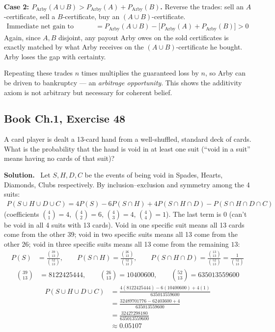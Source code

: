 \documentclass[11pt]{article}
\newcommand{\Sol}{\vspace{2pt}\noindent\textbf{Solution.}\ }
\begin{document}
\textbf{Case 2: $P_{\text{Arby}}(A\cup B) > P_{\text{Arby}}(A)+P_{\text{Arby}}(B)$.}
Reverse the trades: sell an $A$-certificate, sell a $B$-certificate, buy an $(A\cup B)$-certificate.
\begin{align*}
\text{Immediate net gain to Arby's counterparty} &= P_{\text{Arby}}(A\cup B) - \big[P_{\text{Arby}}(A)+P_{\text{Arby}}(B)\big] > 0
\end{align*}
Again, since $A,B$ disjoint, any payout Arby owes on the sold certificates is exactly matched by what Arby receives on the $(A\cup B)$-certificate he bought. Arby loses the gap with certainty.

Repeating these trades $n$ times multiplies the guaranteed loss by $n$, so Arby can be driven to bankruptcy — an \emph{arbitrage opportunity}. This shows the additivity axiom is not arbitrary but necessary for coherent belief.

\subsection{Book Ch.1, Exercise 48}
\begin{qbox}
A card player is dealt a 13-card hand from a well-shuffled, standard deck of cards. What is the probability that the hand is void in at least one suit (``void in a suit'' means having no cards of that suit)?
\end{qbox}
\Sol
Let $S,H,D,C$ be the events of being void in Spades, Hearts, Diamonds, Clubs respectively. By inclusion--exclusion and symmetry among the 4 suits:
\begin{align*}
P(S\cup H\cup D\cup C) = 4P(S) - 6P(S\cap H) + 4P(S\cap H\cap D) - P(S\cap H\cap D\cap C)
\end{align*}
(coefficients $\binom{4}{1}=4$, $\binom{4}{2}=6$, $\binom{4}{3}=4$, $\binom{4}{4}=1$). The last term is $0$ (can't be void in all 4 suits with 13 cards). Void in one specific suit means all 13 cards come from the other $39$; void in two specific suits means all 13 come from the other $26$; void in three specific suits means all 13 come from the remaining $13$:
\begin{align*}
P(S) &= \frac{\binom{39}{13}}{\binom{52}{13}}, \qquad
P(S\cap H) = \frac{\binom{26}{13}}{\binom{52}{13}}, \qquad
P(S\cap H\cap D) = \frac{\binom{13}{13}}{\binom{52}{13}} = \frac{1}{\binom{52}{13}}
\end{align*}
\begin{align*}
\binom{39}{13} &= 8122425444, \qquad \binom{26}{13} = 10400600, \qquad \binom{52}{13} = 635013559600
\end{align*}
\begin{align*}
P(S\cup H\cup D\cup C) &= \frac{4(8122425444) - 6(10400600) + 4(1)}{635013559600}\\
&= \frac{32489701776 - 62403600 + 4}{635013559600}\\
&= \frac{32427298180}{635013559600}\\
&\approx 0.05107
\end{align*}
\end{document}
